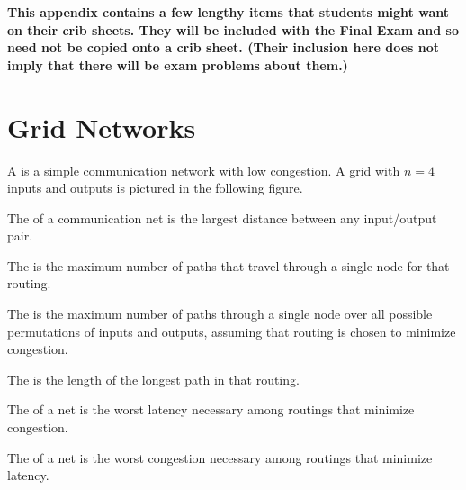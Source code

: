 \documentclass[handout]{mcs}
\begin{document}
  
  
  

 
 \textbf{This appendix contains a few lengthy items that students might want
   on their crib sheets.  They will be included with the Final Exam and so
   need not be copied onto a crib sheet.  (Their inclusion here does not
   imply that there will be exam problems about them.)}



\iffalse

\section{Grid Networks}

A  is a simple communication network with low congestion.  A
grid with $n = 4$ inputs and outputs is pictured in the following figure.


The  of a communication net is the largest distance between
any input/output pair.

The  is the maximum number of paths that
travel through a single node for that routing.

The  is the maximum number of paths through a
single node over all possible permutations of inputs and outputs, assuming
that routing is chosen to minimize congestion.

The  is the length of the longest path in that
routing.
 
The  of a net is the worst
latency necessary among routings that minimize congestion.

The  of a net is the worst
congestion necessary among routings that minimize latency.
\end{document}
